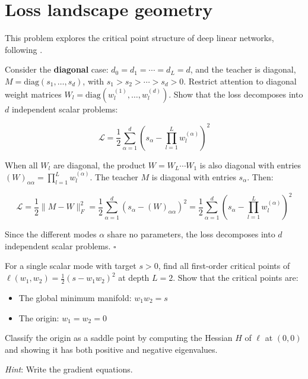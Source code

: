 \documentclass[11pt]{article}
\providecommand{\tightlist}{%
  \setlength{\itemsep}{0pt}\setlength{\parskip}{0pt}}
\begin{document}
\section{Loss landscape geometry}
\label{sec:td-geometry}

This problem explores the critical point structure of deep linear
networks, following \cite{achour2024}.

\begin{exercise}
\label{ex:td-1a}
Consider the \textbf{diagonal} case:
\(d_0 = d_1 = \cdots = d_L = d\), and the teacher is diagonal,
\(M = \text{diag}(s_1, \ldots, s_d)\), with
\(s_1 > s_2 > \cdots > s_d > 0\). Restrict attention to diagonal weight
matrices \(W_l = \text{diag}(w_l^{(1)}, \ldots, w_l^{(d)})\). Show that
the loss decomposes into \(d\) independent scalar problems:

\[\mathcal{L} = \frac{1}{2}\sum_{\alpha=1}^d \left(s_\alpha - \prod_{l=1}^L w_l^{(\alpha)}\right)^2\]
\end{exercise}

\begin{solution}[ex:td-1a]
When all \(W_l\) are diagonal, the product
\(W = W_L \cdots W_1\) is also diagonal with entries
\((W)_{\alpha\alpha} = \prod_{l=1}^L w_l^{(\alpha)}\). The teacher \(M\)
is diagonal with entries \(s_\alpha\). Then:

\[\mathcal{L} = \frac{1}{2}\|M - W\|_F^2 = \frac{1}{2}\sum_{\alpha=1}^d (s_\alpha - (W)_{\alpha\alpha})^2 = \frac{1}{2}\sum_{\alpha=1}^d \left(s_\alpha - \prod_{l=1}^L w_l^{(\alpha)}\right)^2\]

Since the different modes \(\alpha\) share no parameters, the loss
decomposes into \(d\) independent scalar problems. \(\square\)
\end{solution}

\begin{exercise}
\label{ex:td-1b}
For a single scalar mode with target \(s > 0\), find all
first-order critical points of
\(\ell(w_1, w_2) = \frac{1}{2}(s - w_1 w_2)^2\) at depth \(L = 2\). Show
that the critical points are:

\begin{itemize}
\tightlist
\item
  The global minimum manifold: \(w_1 w_2 = s\)
\item
  The origin: \(w_1 = w_2 = 0\)
\end{itemize}

Classify the origin as a saddle point by computing the Hessian \(H\) of
\(\ell\) at \((0,0)\) and showing it has both positive and negative
eigenvalues.

\emph{Hint}: Write the gradient equations.
\end{exercise}
\end{document}
